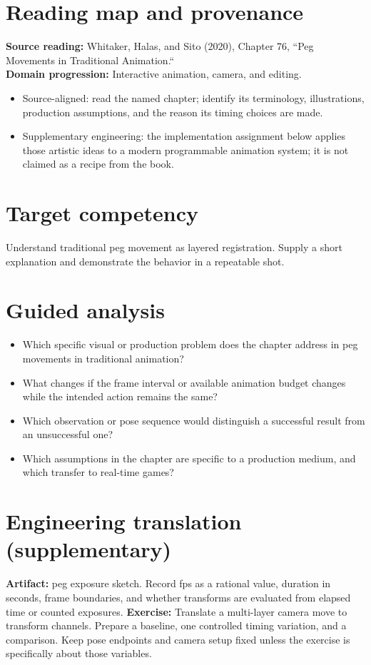 \documentclass[10pt,letterpaper]{article}
\begin{document}
\makedoctitle
\makedocsummary

\section{Reading map and provenance}
\textbf{Source reading:} Whitaker, Halas, and Sito (2020), Chapter 76, ``Peg Movements in Traditional Animation.``\\
\textbf{Domain progression:} Interactive animation, camera, and editing.
\begin{itemize}
\item Source-aligned: read the named chapter; identify its terminology, illustrations, production assumptions, and the reason its timing choices are made.
\item Supplementary engineering: the implementation assignment below applies those artistic ideas to a modern programmable animation system; it is not claimed as a recipe from the book.
\end{itemize}
\section{Target competency}
Understand traditional peg movement as layered registration. Supply a short explanation and demonstrate the behavior in a repeatable shot.
\section{Guided analysis}
\begin{itemize}
\item Which specific visual or production problem does the chapter address in peg movements in traditional animation?
\item What changes if the frame interval or available animation budget changes while the intended action remains the same?
\item Which observation or pose sequence would distinguish a successful result from an unsuccessful one?
\item Which assumptions in the chapter are specific to a production medium, and which transfer to real-time games?
\end{itemize}
\section{Engineering translation (supplementary)}
\textbf{Artifact:} peg exposure sketch. Record fps as a rational value, duration in seconds, frame boundaries, and whether transforms are evaluated from elapsed time or counted exposures.
\textbf{Exercise:} Translate a multi-layer camera move to transform channels. Prepare a baseline, one controlled timing variation, and a comparison. Keep pose endpoints and camera setup fixed unless the exercise is specifically about those variables.
\end{document}
